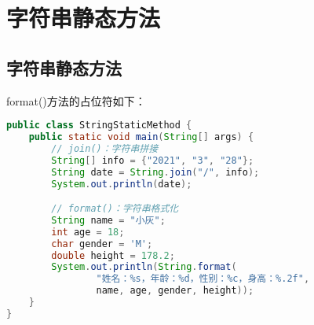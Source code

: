 \newpage

\section{字符串静态方法}

\subsection{字符串静态方法}

\begin{table}[H]
	\centering
	\caption{字符串静态方法}
\end{table}

format()方法的占位符如下：

\begin{table}[H]
	\centering
	\caption{字符串格式化占位符}
\end{table}


\begin{lstlisting}[language=Java]
public class StringStaticMethod {
    public static void main(String[] args) {
        // join()：字符串拼接
        String[] info = {"2021", "3", "28"};
        String date = String.join("/", info);
        System.out.println(date);

        // format()：字符串格式化
        String name = "小灰";
        int age = 18;
        char gender = 'M';
        double height = 178.2;
        System.out.println(String.format(
                "姓名：%s，年龄：%d，性别：%c，身高：%.2f", 
                name, age, gender, height));
    }
}
\end{lstlisting}

